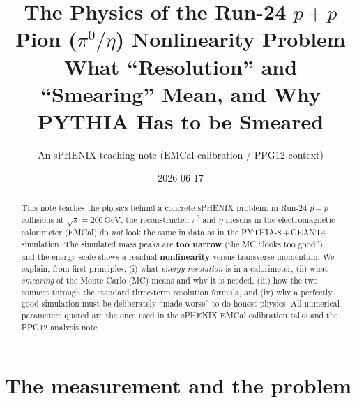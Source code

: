 \documentclass[11pt]{article}
\title{\vspace{-1.2em}\textbf{The Physics of the Run-24 $p{+}p$ Pion
($\pi^0/\eta$) Nonlinearity Problem}\\[4pt]
\large What ``Resolution'' and ``Smearing'' Mean, and Why PYTHIA Has to be Smeared}
\author{An sPHENIX teaching note (EMCal calibration / PPG12 context)}
\date{2026-06-17}
\newcommand{\GeV}{\,\text{GeV}}
\begin{document}
\maketitle
\vspace{-1.0em}

\begin{abstract}
\noindent
This note teaches the physics behind a concrete sPHENIX problem: in Run-24
$p{+}p$ collisions at $\sqrt{s}=200\GeV$, the reconstructed $\pi^0$ and $\eta$
mesons in the electromagnetic calorimeter (EMCal) do \emph{not} look the same in
data as in the PYTHIA-8\,+\,GEANT4 simulation. The simulated mass peaks are
\textbf{too narrow} (the MC ``looks too good''), and the energy scale shows a
residual \textbf{nonlinearity} versus transverse momentum. We explain, from
first principles, (i) what \emph{energy resolution} is in a calorimeter, (ii)
what \emph{smearing} of the Monte Carlo (MC) means and why it is needed, (iii)
how the two connect through the standard three-term resolution formula, and (iv)
why a perfectly good simulation must be deliberately ``made worse'' to do honest
physics. All numerical parameters quoted are the ones used in the sPHENIX
EMCal calibration talks and the PPG12 analysis note.
\end{abstract}

\tableofcontents

\section{The measurement and the problem}
\end{document}
